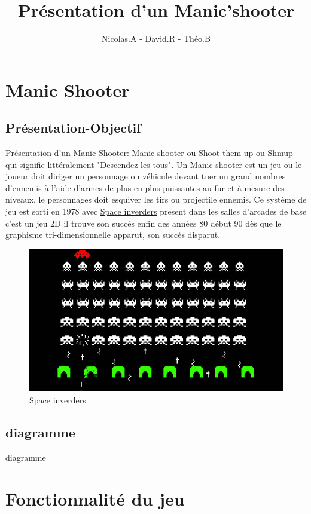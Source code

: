 \documentclass[a4paper, 11pt]{article}
\title{Présentation d'un Manic'shooter}
\author{Nicolas.A - David.R - Théo.B}
\begin{document}
\maketitle
\tableofcontents
\section{Manic Shooter}
\subsection{Présentation-Objectif}

Présentation d'un Manic Shooter:
Manic shooter ou Shoot them up ou Shmup qui signifie littéralement "Descendez-les tous".
Un Manic shooter est un jeu ou le joueur doit diriger un personnage ou véhicule devant tuer un grand nombres d'ennemis à l'aide d'armes de plus en plus puissantes au fur et à mesure des niveaux, le personnages doit esquiver les tirs ou projectile ennemis.
Ce système de jeu est sorti en 1978 avec 
\href{http://dictionnaire.sensagent.leparisien.fr/Space%20Invaders/fr-fr/}{Space inverders}
 present dans les salles d'arcades de base c'est un jeu 2D il trouve son succès enfin des années 80 début 90 dès que le graphisme tri-dimensionnelle apparut, son succès disparut.

 \begin{figure}[ht!]
 \centering
 \includegraphics[width=0.7\linewidth]{space.jpg}
 \caption{Space inverders}
 \label{fig::example::one}
\end{figure}

\subsection{diagramme}

diagramme 

\section{Fonctionnalité du jeu}
\end{document}

